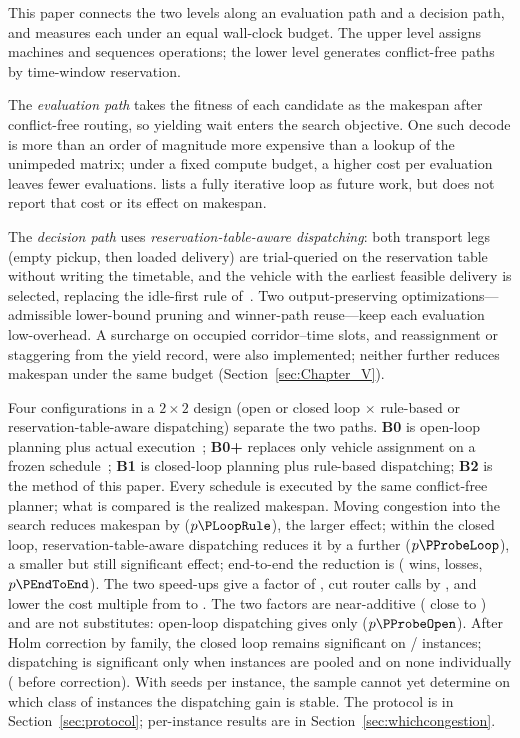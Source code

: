 This paper connects the two levels along an evaluation path and a decision path, and measures each under an equal wall-clock budget.
The upper level assigns machines and sequences operations; the lower level generates conflict-free paths by time-window reservation.

The \emph{evaluation path} takes the fitness of each candidate as the makespan after conflict-free routing, so yielding wait enters the search objective.
One such decode is more than an order of magnitude more expensive than a lookup of the unimpeded matrix; under a fixed compute budget, a higher cost per evaluation leaves fewer evaluations.
\cite{li2026framework} lists a fully iterative loop as future work, but does not report that cost or its effect on makespan.

The \emph{decision path} uses \emph{reservation-table-aware dispatching}: both transport legs (empty pickup, then loaded delivery) are trial-queried on the reservation table without writing the timetable, and the vehicle with the earliest feasible delivery is selected, replacing the idle-first rule of~\cite{li2026framework}.
Two output-preserving optimizations---admissible lower-bound pruning and winner-path reuse---keep each evaluation low-overhead.
A surcharge on occupied corridor--time slots, and reassignment or staggering from the yield record, were also implemented; neither further reduces makespan under the same budget (Section~\ref{sec:Chapter_V}).

Four configurations in a $2\times 2$ design (open or closed loop $\times$ rule-based or reservation-table-aware dispatching) separate the two paths.
\textbf{B0} is open-loop planning plus actual execution~\cite{li2026framework};
\textbf{B0+} replaces only vehicle assignment on a frozen schedule~\cite{sun2023integrated};
\textbf{B1} is closed-loop planning plus rule-based dispatching;
\textbf{B2} is the method of this paper.
Every schedule is executed by the same conflict-free planner; what is compared is the realized makespan.
Moving congestion into the search reduces makespan by \GainLoopRule{} ($p\PLoopRule$), the larger effect;
within the closed loop, reservation-table-aware dispatching reduces it by a further \GainProbeLoop{} ($p\PProbeLoop$), a smaller but still significant effect;
end-to-end the reduction is \GainEndToEnd{} (\WinEndToEnd{} wins, \LoseEndToEnd{} losses, $p\PEndToEnd$).
The two speed-ups give a factor of \SpeedupProbe{}, cut router calls by \RouteCallCut{}, and lower the cost multiple from \CostMultBefore{} to \CostMultAfter{}.
The two factors are near-additive (\GainEndToEnd{} close to \GainIndepProduct{}) and are not substitutes: open-loop dispatching gives only \GainProbeOpen{} ($p\PProbeOpen$).
After Holm correction by family, the closed loop remains significant on \CellsSigLoopAdj{}/\NCases{} instances; dispatching is significant only when instances are pooled and on none individually (\CellsSigProbe{} before correction).
With \NSeeds{} seeds per instance, the sample cannot yet determine on which class of instances the dispatching gain is stable.
The protocol is in Section~\ref{sec:protocol}; per-instance results are in Section~\ref{sec:whichcongestion}.

